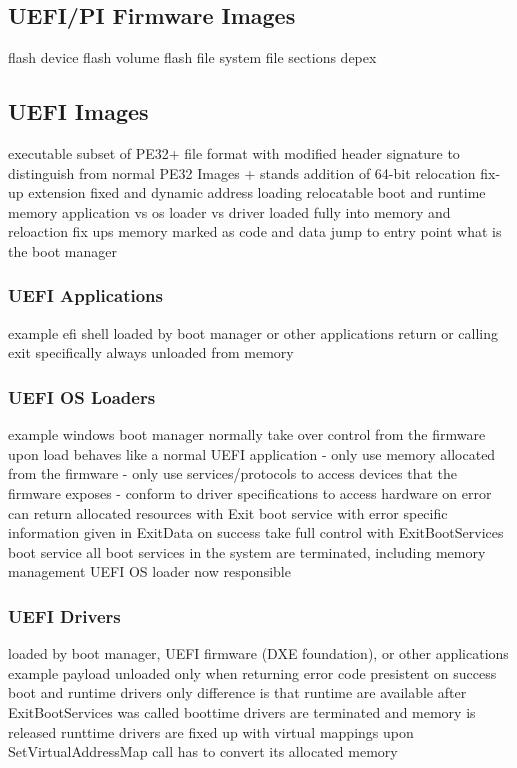 \subsection{UEFI/PI Firmware Images}
flash device
flash volume
flash file system
file sections
depex

\subsection{UEFI Images}
executable
subset of PE32+ file format with modified header signature to distinguish from normal PE32 Images
+ stands addition of 64-bit relocation fix-up extension
fixed and dynamic address loading
relocatable
boot and runtime memory
application vs os loader vs driver
loaded fully into memory and reloaction fix ups
memory marked as code and data
jump to entry point
what is the boot manager

\subsubsection{UEFI Applications}
example efi shell
loaded by boot manager or other applications
return or calling exit specifically
always unloaded from memory

\subsubsection{UEFI OS Loaders}
example windows boot manager
normally take over control from the firmware
upon load behaves like a normal UEFI application
- only use memory allocated from the firmware
- only use services/protocols to access devices that the firmware exposes
- conform to driver specifications to access hardware
on error can return allocated resources with Exit boot service with error specific information given in ExitData
on success take full control with ExitBootServices boot service
all boot services in the system are terminated, including memory management
UEFI OS loader now responsible

\subsubsection{UEFI Drivers}
loaded by boot manager, UEFI firmware (DXE foundation), or other applications
example payload
unloaded only when returning error code
presistent on success
boot and runtime drivers
only difference is that runtime are available after ExitBootServices was called
boottime drivers are terminated and memory is released
runttime drivers are fixed up with virtual mappings upon SetVirtualAddressMap call
has to convert its allocated memory

